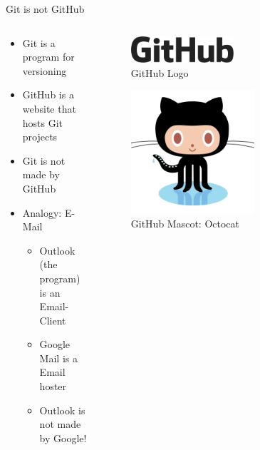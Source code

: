 \documentclass[compress,aspectratio=169]{beamer}
\begin{document}
  \begin{frame}{Git is not GitHub}
    \begin{columns}
      \begin{column}{0.6\textwidth}
        \begin{itemize}
          \item Git is a program for versioning
          \item GitHub is a website that hosts Git projects
          \item Git is not made by GitHub
          \item Analogy: E-Mail
            \begin{itemize}
              \item Outlook (the program) is an Email-Client
              \item Google Mail is a Email hoster
              \item Outlook is not made by Google!
            \end{itemize}
        \end{itemize}
      \end{column}
      \begin{column}{0.4\textwidth}
        \begin{figure}
          \includegraphics[width=0.5\textwidth]{./assets/GitHub.png}
          \caption{GitHub Logo \cite{ghlogo}}
        \end{figure}
        \begin{figure}
          \includegraphics[width=0.6\textwidth]{./assets/octocat.png}
          \caption{GitHub Mascot: Octocat \cite{octodex}}
        \end{figure}
      \end{column}
    \end{columns}
  \end{frame}
\end{document}
